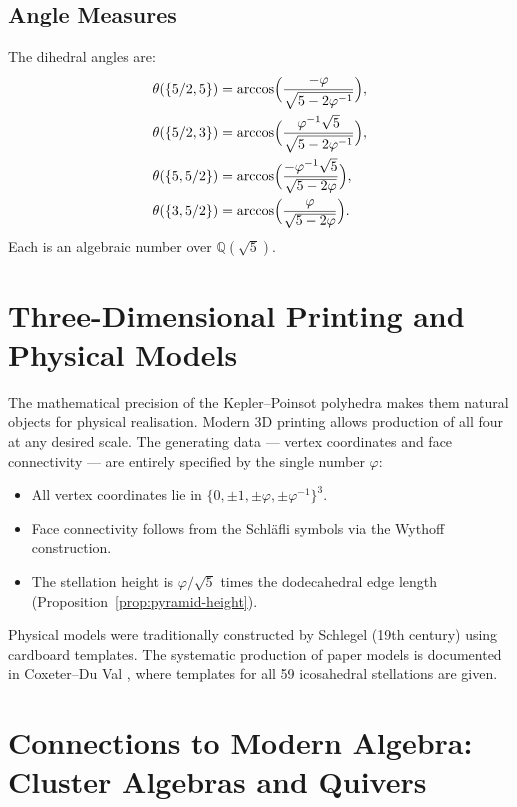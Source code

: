 \subsection{Angle Measures}
\label{ssec:angle-measures-phi}

The dihedral angles are:
\begin{align*}
  \theta(\{5/2,5\}) &= \arccos\Bigl(\frac{-\varphi}{\sqrt{5-2\varphi^{-1}}}\Bigr),\\
  \theta(\{5/2,3\}) &= \arccos\Bigl(\frac{\varphi^{-1}\sqrt{5}}{\sqrt{5-2\varphi^{-1}}}\Bigr),\\
  \theta(\{5,5/2\}) &= \arccos\Bigl(\frac{-\varphi^{-1}\sqrt{5}}{\sqrt{5-2\varphi}}\Bigr),\\
  \theta(\{3,5/2\}) &= \arccos\Bigl(\frac{\varphi}{\sqrt{5-2\varphi}}\Bigr).
\end{align*}
Each is an algebraic number over $\mathbb{Q}(\sqrt5)$.

\section{Three-Dimensional Printing and Physical Models}
\label{sec:physical-models}

The mathematical precision of the Kepler–Poinsot polyhedra
makes them natural objects for physical realisation.  Modern
3D printing allows production of all four at any desired scale.
The generating data — vertex coordinates and face connectivity —
are entirely specified by the single number $\varphi$:
\begin{itemize}
  \item All vertex coordinates lie in $\{0, \pm 1, \pm\varphi,
        \pm\varphi^{-1}\}^3$.
  \item Face connectivity follows from the Schläfli symbols via
        the Wythoff construction.
  \item The stellation height is $\varphi/\sqrt5$ times the
        dodecahedral edge length (Proposition~\ref{prop:pyramid-height}).
\end{itemize}

Physical models were traditionally constructed by Schlegel
(19th century) using cardboard templates.  The systematic
production of paper models is documented in Coxeter–Du Val
\cite{coxeter_fifty_nine_icosahedra}, where templates for all 59 icosahedral
stellations are given.

\section{Connections to Modern Algebra: Cluster Algebras and Quivers}
\label{sec:cluster-algebras}

